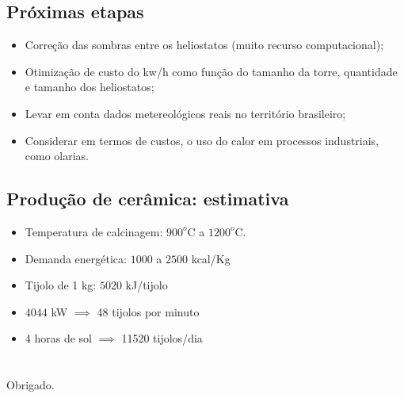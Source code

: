 \documentclass[12pt,notheorems,hyperref={pdfauthor= Rafael Nardi}]{beamer}
\begin{document}
\subsection{Próximas etapas}

\begin{frame}
	\begin{itemize}
		\item Correção das sombras entre os heliostatos (muito recurso computacional);\pause
			\bigskip
		\item Otimização de custo do kw/h como função do tamanho da torre, quantidade e tamanho dos heliostatos;\pause
			\bigskip
		\item Levar em conta dados metereológicos reais no território brasileiro;\pause
			\bigskip
		\item Considerar em termos de custos, o uso do calor
			\bigskip
			em processos industriais, como olarias.
	\end{itemize}
\end{frame}

\subsection{Produção de cerâmica: estimativa}

\begin{frame}
	\begin{itemize}
		\item Temperatura de calcinagem: $900^{o}$C a $1200^{o}$C.
			\bigskip
		\item Demanda energética: $1000$ a $2500$ kcal/Kg
			\bigskip
		\item Tijolo de 1 kg: $5020$ kJ/tijolo
			\bigskip
		\item $4044$ kW $\implies$ 48 tijolos por minuto 
			\bigskip
		\item 4 horas de sol $\implies$ 11520 tijolos/dia
	\end{itemize}
\end{frame}

\section{}
\subsection{}

\begin{frame}%
	\centering
	{\Large Obrigado.}
\end{frame}
\end{document}
